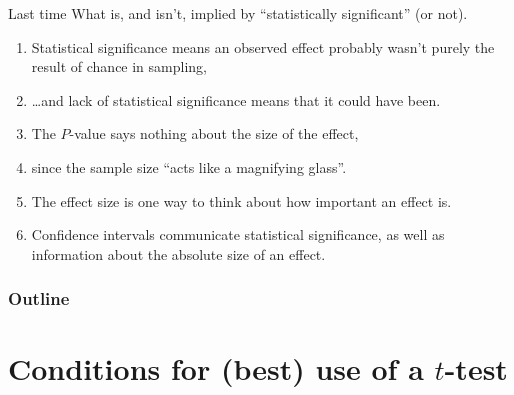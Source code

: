 

\subtitle{and checking conditions}

\date{12 March 2015}




\begin{frame}
  \maketitle
\end{frame}


\begin{frame}{Last time}
  What is, and isn't, implied by ``statistically significant'' (or not).
  \begin{enumerate}
    \item Statistical significance means an observed effect probably wasn't purely the result of chance in sampling,
    \item   \ldots and lack of statistical significance means that it could have been.
    \item The $P$-value says nothing about the size of the effect,
    \item   since the sample size ``acts like a magnifying glass''.
    \item The \alert{effect size} is one way to think about how important an effect is.
    \item Confidence intervals communicate statistical significance,
      as well as information about the absolute size of an effect.
  \end{enumerate}
\end{frame}

\begin{frame}\frametitle<presentation>{Outline}
  \tableofcontents
\end{frame}


\section{Conditions for (best) use of a $t$-test}

